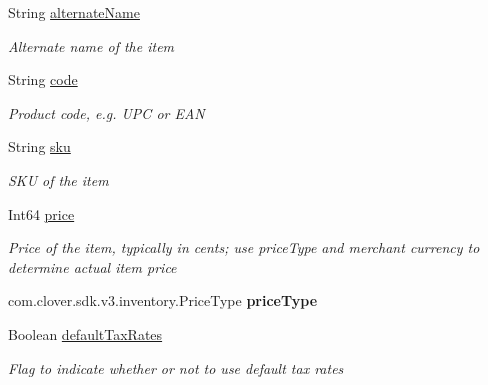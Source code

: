 \begin{DoxyCompactItemize}
String \hyperlink{classcom_1_1clover_1_1sdk_1_1v3_1_1inventory_1_1_item_ac82a6eec76936ce59c611e01a3c112fb}{alternate\+Name}
\begin{DoxyCompactList}\small\item\em Alternate name of the item \end{DoxyCompactList}\item 
String \hyperlink{classcom_1_1clover_1_1sdk_1_1v3_1_1inventory_1_1_item_a9136170e39444f43307d1b53782864c5}{code}
\begin{DoxyCompactList}\small\item\em Product code, e.\+g. U\+PC or E\+AN \end{DoxyCompactList}\item 
String \hyperlink{classcom_1_1clover_1_1sdk_1_1v3_1_1inventory_1_1_item_ab31416347cfb11689955a6118a272964}{sku}
\begin{DoxyCompactList}\small\item\em S\+KU of the item \end{DoxyCompactList}\item 
Int64 \hyperlink{classcom_1_1clover_1_1sdk_1_1v3_1_1inventory_1_1_item_a76cae4be53be49e7205dcb7427eb5d13}{price}
\begin{DoxyCompactList}\small\item\em Price of the item, typically in cents; use price\+Type and merchant currency to determine actual item price \end{DoxyCompactList}\item 
\mbox{\label{classcom_1_1clover_1_1sdk_1_1v3_1_1inventory_1_1_item_ac63cf057404352aa1897a353206fcdb2}} 
com.\+clover.\+sdk.\+v3.\+inventory.\+Price\+Type {\bfseries price\+Type}
\item 
Boolean \hyperlink{classcom_1_1clover_1_1sdk_1_1v3_1_1inventory_1_1_item_acbf6749208f7de59859cfd6042840b65}{default\+Tax\+Rates}
\begin{DoxyCompactList}\small\item\em Flag to indicate whether or not to use default tax rates \end{DoxyCompactList}\item 

\end{DoxyCompactItemize}

